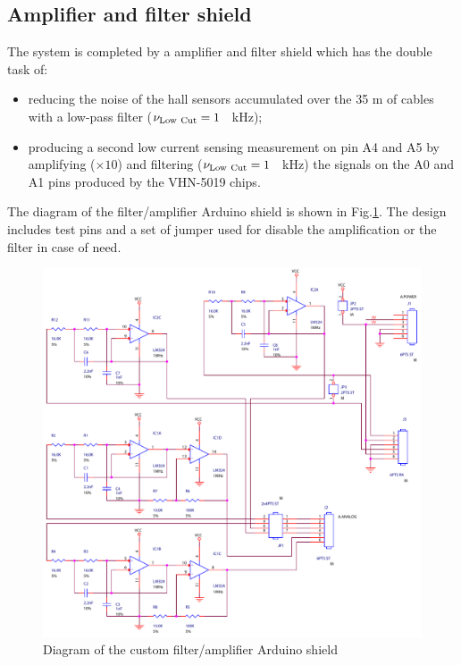 \documentclass[12pt,a4,twoside]{article}
\begin{document}
\subsection{Amplifier and filter shield}
The system is completed by a amplifier and filter shield which has the double task of:\begin{itemize}
\item reducing the noise of the hall sensors accumulated over the 35 m of cables with a low-pass filter \mbox{($\nu_{\rm Low~Cut}=1~$ kHz)};
\item producing a second low current sensing measurement on pin A4 and A5 by amplifying ($\times 10$) and filtering \mbox{($\nu_{\rm Low~Cut}=1~$ kHz)} the signals on the A0 and A1 pins produced by the VHN-5019 chips.
\end{itemize}
The diagram of the filter/amplifier Arduino shield is shown in Fig.\ref{figFilterShield}. The design includes test pins and a set of jumper used for disable the amplification or the filter in case of need.
\begin{figure}[t!]
\centering
\includegraphics[width=1\textwidth]{dpnc303_sch.pdf}
\caption{\label{figFilterShield} {Diagram of the custom filter/amplifier Arduino shield}}
\end{figure}
\end{document}

